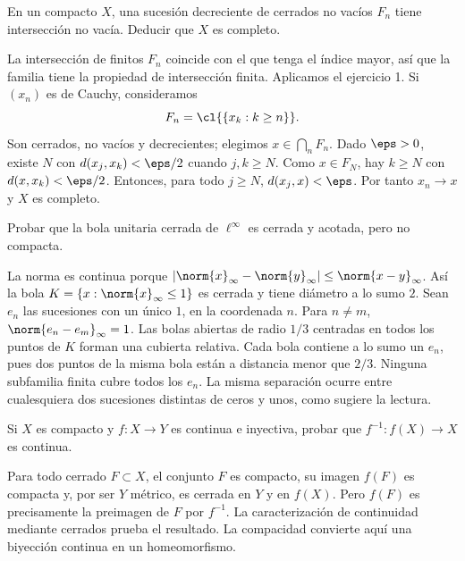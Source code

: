 \begin{ejercicio}
En un compacto $X$, una sucesión decreciente de cerrados no vacíos $F_n$ tiene intersección no vacía. Deducir que $X$ es completo.
\end{ejercicio}
\begin{solucion}
La intersección de finitos $F_n$ coincide con el que tenga el índice mayor, así que la familia tiene la propiedad de intersección finita. Aplicamos el ejercicio 1. Si $(x_n)$ es de Cauchy, consideramos
\[
F_n=\cl{\{x_k:k\ge n\}}.
\]
Son cerrados, no vacíos y decrecientes; elegimos $x\in\bigcap_nF_n$. Dado $\eps>0$, existe $N$ con $d(x_j,x_k)<\eps/2$ cuando $j,k\ge N$. Como $x\in F_N$, hay $k\ge N$ con $d(x,x_k)<\eps/2$. Entonces, para todo $j\ge N$, $d(x_j,x)<\eps$. Por tanto $x_n\to x$ y $X$ es completo.
\end{solucion}

\begin{ejercicio}
Probar que la bola unitaria cerrada de $\ell^\infty$ es cerrada y acotada, pero no compacta.
\end{ejercicio}
\begin{solucion}
La norma es continua porque $|\norm{x}_\infty-\norm{y}_\infty|\le\norm{x-y}_\infty$. Así la bola $K=\{x:\norm{x}_\infty\le1\}$ es cerrada y tiene diámetro a lo sumo $2$. Sean $e_n$ las sucesiones con un único $1$, en la coordenada $n$. Para $n\ne m$, $\norm{e_n-e_m}_\infty=1$. Las bolas abiertas de radio $1/3$ centradas en todos los puntos de $K$ forman una cubierta relativa. Cada bola contiene a lo sumo un $e_n$, pues dos puntos de la misma bola están a distancia menor que $2/3$. Ninguna subfamilia finita cubre todos los $e_n$. La misma separación ocurre entre cualesquiera dos sucesiones distintas de ceros y unos, como sugiere la lectura.
\end{solucion}

\begin{ejercicio}
Si $X$ es compacto y $f:X\to Y$ es continua e inyectiva, probar que $f^{-1}:f(X)\to X$ es continua.
\end{ejercicio}
\begin{solucion}
Para todo cerrado $F\subset X$, el conjunto $F$ es compacto, su imagen $f(F)$ es compacta y, por ser $Y$ métrico, es cerrada en $Y$ y en $f(X)$. Pero $f(F)$ es precisamente la preimagen de $F$ por $f^{-1}$. La caracterización de continuidad mediante cerrados prueba el resultado. La compacidad convierte aquí una biyección continua en un homeomorfismo.
\end{solucion}

